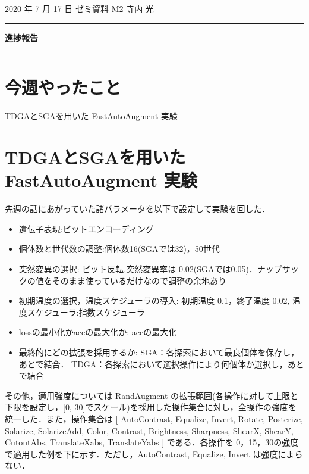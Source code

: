 \documentclass[onecolumn]{ujarticle}   %
\begin{document}
	\noindent

	\hspace{1em}
	2020 年 7 月 17 日
	ゼミ資料
	\hfill
	M2 寺内 光

	\vspace{2mm}

	\hrule

	\begin{center}
		{\Large \bf 進捗報告}
	\end{center}

	\hrule
	\vspace{3mm}

	\section{今週やったこと}
	\begin{itemize}{
    \item{TDGAとSGAを用いた FastAutoAugment 実験}
	}\end{itemize}
	\section{TDGAとSGAを用いた FastAutoAugment 実験}
  先週の話にあがっていた諸パラメータを以下で設定して実験を回した．
  \begin{itemize}
    \item{遺伝子表現:ビットエンコーディング}
    \item{個体数と世代数の調整:個体数16(SGAでは32)，50世代}
    \item{突然変異の選択: ビット反転.突然変異率は 0.02(SGAでは0.05)．ナップサックの値をそのまま使っているだけなので調整の余地あり}
    \item{初期温度の選択，温度スケジューラの導入: 初期温度 0.1，終了温度 0.02, 温度スケジューラ:指数スケジューラ}
    \item{lossの最小化かaccの最大化か: accの最大化}
    \item{最終的にどの拡張を採用するか: SGA：各探索において最良個体を保存し，あとで結合． TDGA：各探索において選択操作により何個体か選択し，あとで結合}
  \end{itemize}

  その他，適用強度については RandAugment の拡張範囲(各操作に対して上限と下限を設定し，[0, 30]でスケール)を採用した操作集合に対し，全操作の強度を統一した．また，操作集合は [
        AutoContrast,
        Equalize,
        Invert,
        Rotate,
        Posterize,
        Solarize,
        SolarizeAdd,
        Color,
        Contrast,
        Brightness,
        Sharpness,
        ShearX,
        ShearY,
        CutoutAbs,
        TranslateXabs,
        TranslateYabs
    ]
    である．各操作を 0，15，30の強度で適用した例を下に示す．ただし，AutoContrast, Equalize, Invert は強度によらない．
\end{document}

